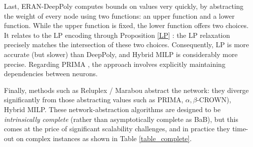 

Last, ERAN-DeepPoly \cite{deeppoly} computes bounds on values very quickly, by abstracting the weight of every node using two functions: an upper function and a lower function. While the upper function is fixed, the lower function offers two choices.
It relates to the LP encoding through Proposition \ref{LP} \cite{alessandro}: the LP relaxation precisely matches the intersection of these two choices. Consequently, LP is more accurate (but slower) than DeepPoly, and Hybrid MILP is considerably more precise. Regarding PRIMA \cite{prima}, the approach involves explicitly maintaining dependencies between neurons.




Finally, methods such as Reluplex / Marabou \cite{Reluplex,Marabou}  abstract the network: they diverge significantly from those abstracting values such as PRIMA, $\alpha,\beta$-CROWN)\cite{prima,crown}, Hybrid MILP. These network-abstraction algorithms are designed to be {\em intrinsically complete} (rather than asymptotically complete as BaB), but this comes at the price of significant scalability challenges, and in practice they time-out on complex instances as shown in Table \ref{table_complete}.